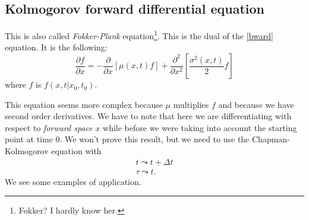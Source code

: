 \documentclass[12pt]{report}
\begin{document}
\subsection{Kolmogorov forward differential equation}
This is also called \emph{Fokker-Plank} equation\footnote{Fokker? I hardly know her.}. This is the dual of the \ref{bward} equation. It is the following:
\begin{equation*}
	\frac{\partial f}{\partial x}=-\frac{\partial}{\partial x}[\mu(x,t)f]+\frac{\partial^{2}}{\partial x^{2}}\left[\frac{\sigma^{2}(x,t)}{2}f\right]\tag*{\faForward}\label{fwd}
\end{equation*}
where $f$ is $f(x,t|x_{0},t_{0})$. \par
This equation seems more complex because $\mu$ multiplies $f$ and because we have second order derivatives. We have to note that here we are differentiating with respect to \textit{forward space} $x$ while before we were taking into account the starting point at time 0. We won't prove this result, but we need to use the Chapman-Kolmogorov equation with
\begin{equation*}
	\begin{array}{l}
		t\leadsto t+\Delta t\\
		\tau\leadsto t.
	\end{array}
\end{equation*}
We see some examples of application.
\end{document}
